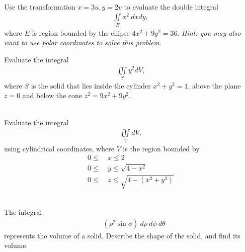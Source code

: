 \item %
 \\
Use the transformation $x = 3u, y = 2v$ to evaluate the double integral
\begin{align*}
  \iint\limits_E x^2 \ dxdy,
\end{align*}
where $E$ is region bounded by the ellipse $4x^2 + 9y^2 = 36$. \textit{Hint: you may also want to use polar coordinates to solve this problem}.
\item %
Evaluate the integral
\begin{align*}
  \iiint\limits_S y^2dV,
\end{align*}
where $S$ is the solid that lies inside the cylinder $x^2+y^2 = 1$, above the plane $z=0$ and below the cone $z^2 = 9x^2 + 9y^2$. 
\item %
 \\
Evaluate the integral
\begin{align*}
  \iiint\limits_V dV,
\end{align*}
using cylindrical coordinates, where $V$ is the region bounded by
\begin{align*}
  0 \le\ &x \le 2 \\
  0 \le\ &y \le \sqrt{4 - x^2}\\
  0 \le\ &z \le \sqrt{4 - (x^2+ y^2)}
\end{align*} 
\item %
 \\
The integral
\begin{align*}
  \mathop{\int_0^{\pi/4} \!\! \int_{0}^{\pi/2} \!\! \int_0^1 } ( \rho^2 \sin\phi ) \ d\rho\  d\phi\  d\theta
\end{align*}
represents the volume of a solid. Describe the shape of the solid, and find its volume. \\
